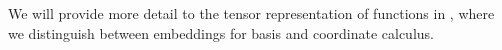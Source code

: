 

We will provide more detail to the tensor representation of functions in , where we distinguish between embeddings for basis and coordinate calculus. %





